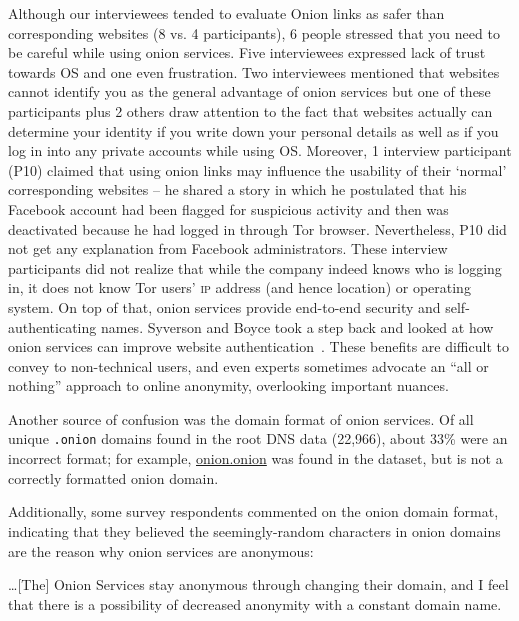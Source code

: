 Although our interviewees tended to evaluate Onion links as safer than corresponding websites (8 vs. 4 participants), 6 people stressed that you need to be careful while using onion services.  Five interviewees expressed lack of trust towards OS and one even frustration.  Two interviewees mentioned that websites cannot identify you as the general advantage of onion services but one of these participants plus 2 others draw attention to the fact that websites actually can determine your identity if you write down your personal details as well as if you log in into any private accounts while using OS. Moreover, 1 interview participant (P10) claimed that using onion links may influence the usability of their ‘normal’ corresponding websites – he shared a story in which he postulated that his Facebook account had been flagged for suspicious activity and then was deactivated because he had logged in through Tor browser.  Nevertheless, P10 did not get any explanation from Facebook administrators. These interview participants did not realize that while the company indeed
knows who is logging in, it does not know Tor users' \textsc{ip} address (and
hence location) or operating system. On top of that, onion services provide
end-to-end security and self-authenticating names.  Syverson and Boyce took a
step back and looked at how onion services can improve website
authentication~\cite{Syverson2015a}.  These benefits are difficult to convey to
non-technical users, and even experts sometimes advocate an ``all or nothing''
approach to online anonymity, overlooking important nuances. 

Another source of confusion was the domain format of onion services.  Of all unique {\tt .onion} 
domains found in the root DNS data (22,966), about 33\% were an incorrect format; for example, 
\url{onion.onion} was found in the dataset, but is not a correctly formatted onion domain.

Additionally, some survey respondents commented on the onion domain format, indicating that they believed the seemingly-random
characters in onion domains are the reason why onion services are anonymous:

\begin{displayquote}
\ldots [The] Onion Services stay anonymous through changing their domain, and I
feel that there is a possibility of decreased anonymity with a constant domain
name.
\end{displayquote}

